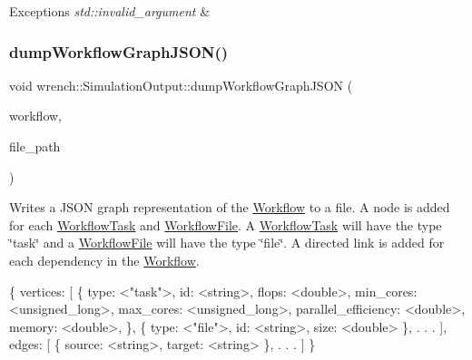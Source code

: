 \begin{DoxyExceptions}{Exceptions}
{\em std\+::invalid\+\_\+argument} & \\
\hline
\end{DoxyExceptions}
\mbox{\label{classwrench_1_1_simulation_output_aeb5ce1ef8b84cda7b0df5f21532088b2}} 
\subsubsection{\texorpdfstring{dump\+Workflow\+Graph\+J\+S\+O\+N()}{dumpWorkflowGraphJSON()}}
{\footnotesize\ttfamily void wrench\+::\+Simulation\+Output\+::dump\+Workflow\+Graph\+J\+S\+ON (\begin{DoxyParamCaption}\item[{\hyperlink{classwrench_1_1_workflow}{wrench\+::\+Workflow} $\ast$}]{workflow,  }\item[{std\+::string}]{file\+\_\+path }\end{DoxyParamCaption})}



Writes a J\+S\+ON graph representation of the \hyperlink{classwrench_1_1_workflow}{Workflow} to a file.  A node is added for each \hyperlink{classwrench_1_1_workflow_task}{Workflow\+Task} and \hyperlink{classwrench_1_1_workflow_file}{Workflow\+File}. A \hyperlink{classwrench_1_1_workflow_task}{Workflow\+Task} will have the type \char`\"{}task\char`\"{} and a \hyperlink{classwrench_1_1_workflow_file}{Workflow\+File} will have the type \char`\"{}file\char`\"{}. A directed link is added for each dependency in the \hyperlink{classwrench_1_1_workflow}{Workflow}. 


\begin{DoxyPre}
\{
     vertices: [
         \{
             type: <"task">,
             id: <string>,
             flops: <double>,
             min\_cores: <unsigned\_long>,
             max\_cores: <unsigned\_long>,
             parallel\_efficiency: <double>,
             memory: <double>,
         \},
         \{
             type: <"file">,
             id: <string>,
             size: <double>
         \}, . . .
     ],
     edges: [
         \{
             source: <string>,
             target: <string>
         \}, . . .
     ]
 \}
 \end{DoxyPre}



